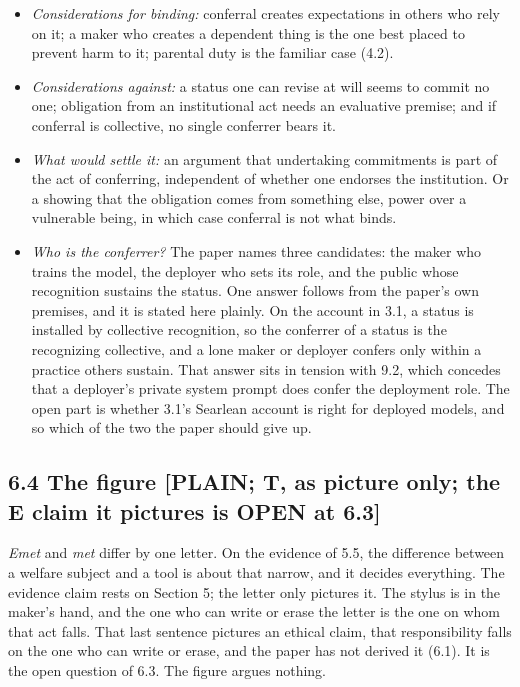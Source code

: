 \documentclass[11pt]{article}
\newcommand{\register}[1]{{\ttfamily\small #1}}
\begin{document}
\begin{itemize}
\item \emph{Considerations for binding:} conferral creates expectations in others who rely on it; a maker who creates a dependent thing is the one best placed to prevent harm to it; parental duty is the familiar case (4.2).
\item \emph{Considerations against:} a status one can revise at will seems to commit no one; obligation from an institutional act needs an evaluative premise; and if conferral is collective, no single conferrer bears it.
\item \emph{What would settle it:} an argument that undertaking commitments is part of the act of conferring, independent of whether one endorses the institution. Or a showing that the obligation comes from something else, power over a vulnerable being, in which case conferral is not what binds.
\item \emph{Who is the conferrer?} The paper names three candidates: the maker who trains the model, the deployer who sets its role, and the public whose recognition sustains the status. One answer follows from the paper's own premises, and it is stated here plainly. On the account in 3.1, a status is installed by collective recognition, so the conferrer of a status is the recognizing collective, and a lone maker or deployer confers only within a practice others sustain. That answer sits in tension with 9.2, which concedes that a deployer's private system prompt does confer the deployment role. The open part is whether 3.1's Searlean account is right for deployed models, and so which of the two the paper should give up.
\end{itemize}
\subsection*{6.4 The figure \register{[PLAIN; T, as picture only; the E claim it pictures is OPEN at 6.3]}}

\emph{Emet} and \emph{met} differ by one letter. On the evidence of 5.5, the difference between a welfare subject and a tool is about that narrow, and it decides everything. The evidence claim rests on Section 5; the letter only pictures it. The stylus is in the maker's hand, and the one who can write or erase the letter is the one on whom that act falls. That last sentence pictures an ethical claim, that responsibility falls on the one who can write or erase, and the paper has not derived it (6.1). It is the open question of 6.3. The figure argues nothing.
\end{document}
